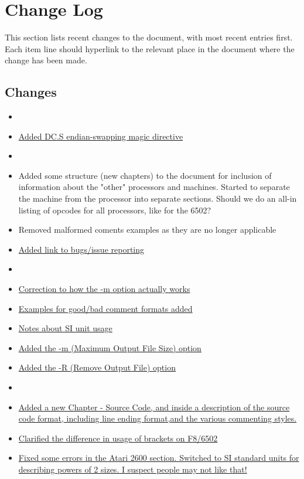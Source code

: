 \section*{Change Log}
\label{section:changelog}

This section lists recent changes to the document, with most recent entries first. Each item line should hyperlink to the relevant place in the document where the change has been made.

\subsection*{Changes}

\begin{itemize}

\item[]
\item \hyperref[changelog:20200915endian]{Added DC.S endian-swapping magic directive}

\item[]
\item Added some structure (new chapters) to the document for inclusion of information about the "other" processors and machines. Started to separate the machine from the processor into separate sections. Should we do an all-in listing of opcodes for all processors, like for the 6502?
\item Removed malformed coments examples as they are no longer applicable
\item \hyperref[changelog:20200913bugs]{Added link to bugs/issue reporting}

\item[]
\item \hyperref[changelog:20200908optionm]{Correction to how the -m option actually works}
\item \hyperref[changelog:20200909comment]{Examples for good/bad comment formats added}
\item \hyperref[changelog:20200909SI]{Notes about SI unit usage}
\item \hyperref[flag:maximum]{Added the -m (Maximum Output File Size) option}
\item \hyperref[flag:remove]{Added the -R (Remove Output File) option}

\item[]
\item \hyperref[changelog:20200908source]{Added a new Chapter - Source Code, and inside a description of the source code format, including line ending format,and  the various commenting styles.}
\item \hyperref[changelog:20200908brackets]{Clarified the difference in usage of brackets on F8/6502}
\item \hyperref[changelog:20200908atari]{Fixed some errors in the Atari 2600 section. Switched to SI standard units for describing powers of 2 sizes. I suspect people may not like that!}


\end{itemize}

